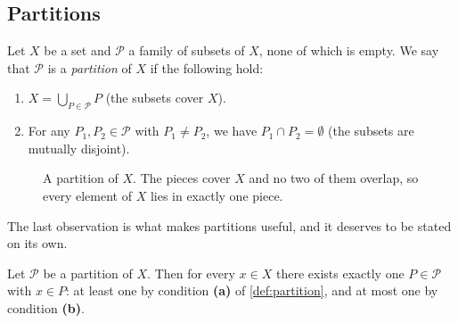 \subsection{Partitions}

\begin{definition}[Partition]
\label{def:partition}
Let $X$ be a set and $\mathcal{P}$ a family of subsets of $X$, none of which is empty. We say that $\mathcal{P}$ is a \textit{partition} of $X$ if the following hold:
\begin{enumerate}
    \item $X = \bigcup_{P \in \mathcal{P}} P$ (the subsets cover $X$).
    \item For any $P_1, P_2 \in \mathcal{P}$ with $P_1 \ne P_2$, we have $P_1 \cap P_2 = \emptyset$ (the subsets are mutually disjoint).
\end{enumerate}
\end{definition}

\begin{figure}[ht!]
  \centering
  \caption{A partition of $X$. The pieces cover $X$ and no two of them overlap, so every element of $X$ lies in exactly one piece.}
  \label{fig:partition}
\end{figure}

The last observation is what makes partitions useful, and it deserves to be stated on its own.

\begin{lemma}
\label{lem:unique_piece}
Let $\mathcal{P}$ be a partition of $X$. Then for every $x \in X$ there exists exactly one $P \in \mathcal{P}$ with $x \in P$: at least one by condition \textbf{(a)} of \cref{def:partition}, and at most one by condition \textbf{(b)}.
\end{lemma}

